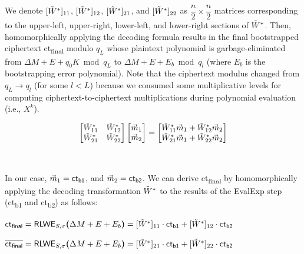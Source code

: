 $ $

$ $

We denote $[\tilde W^*]_{11}$, $[\tilde W^*]_{12}$, $[\tilde W^*]_{21}$, and $[\tilde W^*]_{22}$ as $\dfrac{n}{2} \times \dfrac{n}{2}$ matrices corresponding to the upper-left, upper-right, lower-left, and lower-right sections of $\tilde W^*$. Then, homomorphically applying the decoding formula results in the final bootstrapped ciphertext \textsf{ct\textsubscript{final}} modulo $q_L$ whose plaintext polynomial is garbage-eliminated from $\Delta M + E + q_0K \bmod q_L$ to $\Delta M + E + E_b \bmod q_l$ (where $E_b$ is the bootstrapping error polynomial). Note that the ciphertext modulus changed from $q_L \rightarrow q_l$ (for some $l < L$) because we consumed some multiplicative levels for computing ciphertext-to-ciphertext multiplications during polynomial evaluation (i.e., $X^k$).  

$$\begin{bmatrix} \tilde{W}^*_{11} & \tilde{W}^*_{12} \\ \tilde{W}^*_{21} & \tilde{W}^*_{22} \end{bmatrix} \begin{bmatrix} \vec{m}_1 \\ \vec{m}_2 \end{bmatrix} = \begin{bmatrix} \tilde{W}^*_{11}\vec{m}_1 + \tilde{W}^*_{12}\vec{m}_2 \\ \tilde{W}^*_{21}\vec{m}_1 + \tilde{W}^*_{22}\vec{m}_2 \end{bmatrix}$$

$ $

In our case, $\vec{m}_1 = \textsf{ct\textsubscript{b1}}$, and $\vec{m}_2 = \textsf{ct\textsubscript{b2}}$. We can derive  \textsf{ct\textsubscript{final}} by homomorphically applying the decoding transformation $\tilde{W}^*$ to the results of the \textsf{EvalExp} step (\textsf{ct\textsubscript{b1}} and \textsf{ct\textsubscript{b2}}) as follows:


$\textsf{ct\textsubscript{final}} = \textsf{RLWE}_{S, \sigma}\bm(\Delta M + E + E_{b}\bm) = [\tilde W^*]_{11} \cdot \textsf{ct\textsubscript{b1}} + [\tilde W^*]_{12} \cdot \textsf{ct\textsubscript{b2}}$

$\overline{\textsf{ct\textsubscript{final}}} = \textsf{RLWE}_{S, \sigma}\bm(\Delta M + E + E_{b}\bm) = [\tilde W^*]_{21} \cdot \textsf{ct\textsubscript{b1}} + [\tilde W^*]_{22} \cdot \textsf{ct\textsubscript{b2}}$

$ $

